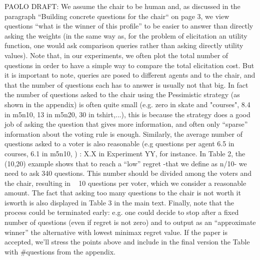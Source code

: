 \documentclass{article}
\begin{document}
PAOLO DRAFT: We assume the chair to be human and, as discussed in the paragraph “Building concrete questions for the chair“ on page 3, we view questions “what is the winner of this profile” to be easier to answer than directly asking the weights (in the same way as, for the problem of elicitation an utility function, one would ask comparison queries rather than asking directly utility values). 
Note that, in our experiments, we often plot the total number of questions in order to have a simple way to compare the total elicitation cost. But it is important to note,  queries are posed to different agents and to the chair, and that the number of questions each has to answer is usually not that big. In fact the number of questions asked to the chair using the Pessimistic strategy (as shown in the appendix) is often quite small  (e.g. zero in skate and "courses", 8.4 in m5n10, 13 in m5n20, 30 in tshirt,...), this is because the strategy does a good job of asking the question that gives more information, and often only “sparse” information about the voting rule is enough. Similarly, the average number of questions asked to a voter is also reasonable (e.g questions per agent 6.5 in courses, 6.1 in m5n10,  )
: X.X in Experiment YY, for instance. In Table 2, the (10,20) example shows that to reach a “low” regret -that we define as n/10- we need to ask 340 questions. This number should be divided among the voters and the chair, resulting in ~ 10 questions per voter, which we consider a reasonable amount. The fact that asking too many questions to the chair is not worth it isworth is also displayed in Table 3 in the main text.
Finally, note that the process could be terminated early: e.g. one could decide to stop after a fixed number of questions (even if regret is not zero) and to output as an “approximate winner” the alternative with lowest minimax regret value.
If the paper is accepted, we’ll stress the points above and include in the final version the Table with $\#$questions from the appendix.
\end{document}
